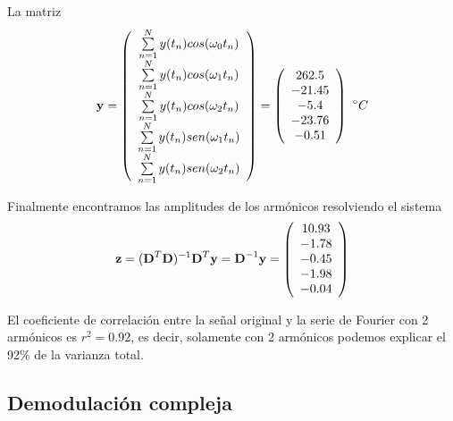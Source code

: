 \documentclass[
]{agujournal2019}
\begin{document}
La matriz \[{\textbf y}=\left( \begin{array}{ccc}
\sum\limits^N_{n=1}y(t_n)cos(\omega_0 t_n) \\
\sum\limits^N_{n=1}y(t_n)cos(\omega_1 t_n) \\
\sum\limits^N_{n=1}y(t_n)cos(\omega_2 t_n) \\
\sum\limits^N_{n=1}y(t_n)sen(\omega_1 t_n) \\
\sum\limits^N_{n=1}y(t_n)sen(\omega_2 t_n) \\
\end{array} \right)=
\left( \begin{array}{ccc}
262.5 \\
-21.45 \\
-5.4 \\
-23.76 \\
-0.51 \\
\end{array} \right)\,\,^\circ{C}\]

Finalmente encontramos las amplitudes de los armónicos resolviendo el
sistema
\[{\textbf z}=({\textbf D}^T{\textbf D})^{-1}{\textbf D}^{T}{\textbf y}={\textbf D}^{-1}{\textbf y}=\left( \begin{array}{ccc}
10.93\\
-1.78\\
-0.45\\
-1.98\\
-0.04
\end{array} \right)\]

El coeficiente de correlación entre la señal original y la serie de
Fourier con 2 armónicos es \(r^2=0.92\), es decir, solamente con 2
armónicos podemos explicar el 92\% de la varianza total.

\subsection{\textbf \noindent Demodulación compleja}
\end{document}
